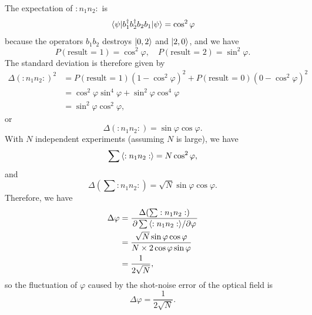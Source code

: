 \documentclass[hyperref, a4paper]{article}
\begin{document}
The expectation of $:n_1 n_2:$ is 
\begin{equation}
    \mel*{\psi}{b_1^\dagger b_2^\dagger b_2 b_1}{\psi} = \cos^2 \varphi 
\end{equation}
because the operators $b_1 b_2$ destroys $\ket{0, 2}$ and $\ket{2, 0}$, and we have 
\begin{equation}
    P(\text{result = $1$}) = \cos^2 \varphi, \quad P(\text{result = $2$}) = \sin^2 \varphi.
\end{equation}
The standard deviation is therefore given by
\[
    \begin{aligned}
        \Delta(: n_1 n_2 :)^2 &= P(\text{result = $1$}) (1 - \cos^2 \varphi)^2 + P(\text{result = $0$}) (0 - \cos^2 \varphi)^2 \\
        &= \cos^2 \varphi \sin^4 \varphi + \sin^2 \varphi \cos^4 \varphi \\
        &= \sin^2 \varphi \cos^2 \varphi,
    \end{aligned}
\]
or 
\begin{equation}
    \Delta(: n_1 n_2 :) = \sin \varphi \cos \varphi.
\end{equation}
With $N$ independent experiments (assuming $N$ is large), we have 
\[
    \sum \expval{: n_1 n_2 :} = N \cos^2 \varphi,
\]
and 
\[
    \Delta(\sum :n_1 n_2:) = \sqrt{N} \sin\varphi \cos \varphi.
\]
Therefore, we have 
\[
    \begin{aligned}
        \Delta\varphi &= \frac{\Delta(\sum :n_1 n_2:)}{\pdv*{\sum \expval{: n_1 n_2 :}}{\varphi}} \\
        &= \frac{\sqrt{N} \sin \varphi \cos \varphi}{N \times 2 \cos \varphi \sin \varphi} \\
        &= \frac{1}{2 \sqrt{N}},
    \end{aligned}
\]
so the fluctuation of $\varphi$ caused by the shot-noise error of the optical field is 
\begin{equation}
    \Delta\varphi = \frac{1}{2 \sqrt{N}}.
\end{equation}


 
\end{document}
